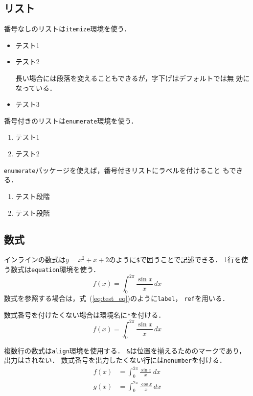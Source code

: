 \subsection{リスト}

番号なしのリストは\texttt{itemize}環境を使う．
\begin{itemize}
 \item テスト1
 \item テスト2

       長い場合には段落を変えることもできるが，字下げはデフォルトでは無
       効になっている．
 \item テスト3
\end{itemize}

番号付きのリストは\texttt{enumerate}環境を使う．
\begin{enumerate}
 \item テスト1
 \item テスト2
\end{enumerate}

\texttt{enumerate}パッケージを使えば，番号付きリストにラベルを付けること
もできる．
\begin{enumerate}[（第1段階）]
 \item テスト段階
 \item テスト段階
\end{enumerate}

\subsection{数式}

インラインの数式は$y=x^2+x+2$のように\texttt{\$}で囲うことで記述できる．
1行を使う数式は\texttt{equation}環境を使う．
\begin{equation}
 f(x) = \int_0^{2\pi}\frac{\sin x}{x}\,dx
  \label{eq:test_eq}
\end{equation}
数式を参照する場合は，式~(\ref{eq:test_eq})のように\texttt{\yen label}，
\texttt{\yen ref}を用いる．

数式番号を付けたくない場合は環境名に\texttt{*}を付ける．
\begin{equation*}
 f(x) = \int_0^{2\pi}\frac{\sin x}{x}\,dx
\end{equation*}


複数行の数式は\texttt{align}環境を使用する．
\texttt{\&}は位置を揃えるためのマークであり，出力はされない．
数式番号を出力したくない行には\texttt{\yen nonumber}を付ける．
\begin{align}
 f(x) &= \int_0^{2\pi}\frac{\sin x}{x}\,dx \nonumber\\
 g(x) &= \int_0^{2\pi}\frac{\cos x}{x}\,dx
\end{align}

